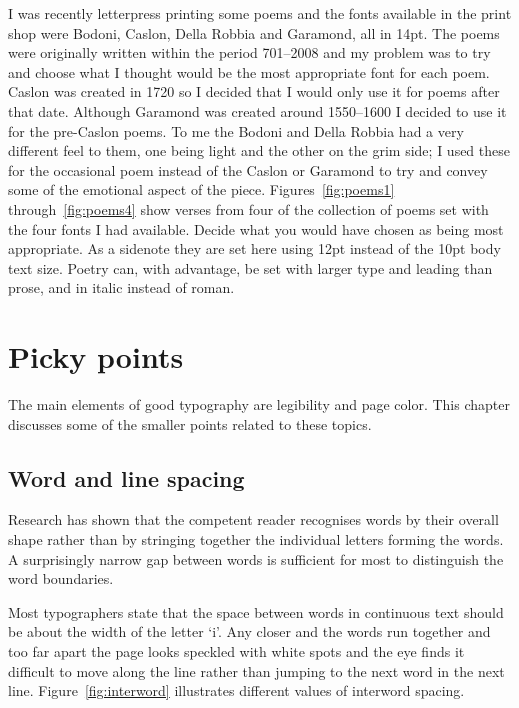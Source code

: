 \documentclass[10pt,a4paper,extrafontsizes]{memoir}
\begin{document}
\begin{paracol}{2}
\switchEng
    I was recently letterpress printing some poems and the fonts  
available in the print shop were Bodoni, 
Caslon, Della Robbia and 
Garamond, 
all in 14pt. The poems
were originally written within the period 701--2008 and my problem was to
try and choose what I thought would be the most appropriate font for each
poem. Caslon was created in 1720 so I decided that 
I would only use it for poems after that date. Although 
Garamond was created around 1550--1600 I
decided to use it for the pre-Caslon poems. 
To me the Bodoni and 
Della Robbia  
had a very different feel to them, one being light and the other on the grim
side; I used these for the occasional poem instead of the 
Caslon or Garamond
to try and convey some of the emotional aspect of the piece. 
Figures~\ref{fig:poems1} through~\ref{fig:poems4} show verses from four
of the collection of poems set with the four fonts I had available. 
Decide what you would have chosen as being most appropriate. As a 
sidenote they are set here using 12pt instead of the 10pt body text size.
Poetry can, with advantage, be set with larger type and 
leading than prose,
and in italic instead of roman.
\end{paracol}



\chapter{Picky points}
\let\footnoterule\oldfootnoterule

\begin{paracol}{2}
\switchEng
    The main elements of good typography are legibility 
and page color.
This chapter discusses some of the smaller points related to 
these topics.
\end{paracol}

\section{Word and line spacing}

\begin{paracol}{2}
\switchEng
    Research has shown that the competent reader recognises words by
their overall shape rather than by stringing together the individual letters
forming the words. A surprisingly narrow gap between words
is sufficient for most to distinguish the word boundaries.

    Most typographers state that the space between 
words
 in continuous
text should be about the width of the letter `i'. Any closer and the
words run together and too far apart the page looks speckled with white
spots and the eye finds it difficult to move along the line rather than
jumping to the next word in the next line. 
    Figure~\ref{fig:interword} illustrates different values of interword
spacing.
\end{paracol}
\end{document}
